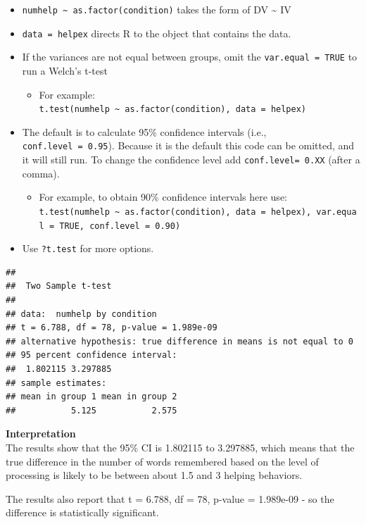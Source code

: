 \documentclass[
]{book}
\providecommand{\tightlist}{%
  \setlength{\itemsep}{0pt}\setlength{\parskip}{0pt}}
\begin{document}
\begin{itemize}
\tightlist
\item
  \texttt{numhelp\ \textasciitilde{}\ as.factor(condition)} takes the form of DV \textasciitilde{} IV
\item
  \texttt{data\ =\ helpex} directs R to the object that contains the data.
\item
  If the variances are not equal between groups, omit the \texttt{var.equal\ =\ TRUE} to run a Welch's t-test

  \begin{itemize}
  \tightlist
  \item
    For example: \texttt{t.test(numhelp\ \textasciitilde{}\ as.factor(condition),\ data\ =\ helpex)}
  \end{itemize}
\item
  The default is to calculate 95\% confidence intervals (i.e., \texttt{conf.level\ =\ 0.95}). Because it is the default this code can be omitted, and it will still run. To change the confidence level add \texttt{conf.level=\ 0.XX} (after a comma).

  \begin{itemize}
  \tightlist
  \item
    For example, to obtain 90\% confidence intervals here use: \texttt{t.test(numhelp\ \textasciitilde{}\ as.factor(condition),\ data\ =\ helpex),\ var.equal\ =\ TRUE,\ conf.level\ =\ 0.90)}
  \end{itemize}
\item
  Use \texttt{?t.test} for more options.
\end{itemize}

\begin{verbatim}
## 
##  Two Sample t-test
## 
## data:  numhelp by condition
## t = 6.788, df = 78, p-value = 1.989e-09
## alternative hypothesis: true difference in means is not equal to 0
## 95 percent confidence interval:
##  1.802115 3.297885
## sample estimates:
## mean in group 1 mean in group 2 
##           5.125           2.575
\end{verbatim}

\textbf{Interpretation}\\
The results show that the 95\% CI is 1.802115 to 3.297885, which means that the true difference in the number of words remembered based on the level of processing is likely to be between about 1.5 and 3 helping behaviors.

The results also report that t = 6.788, df = 78, p-value = 1.989e-09 - so the difference is statistically significant.
\end{document}
